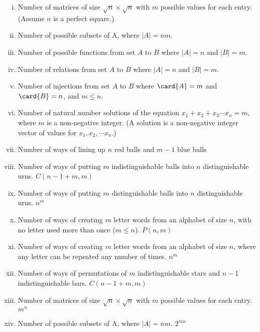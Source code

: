 \documentclass[quiz]{mcs}
\begin{document}
\begin{problem}
\begin{enumerate}[(i)]
\item Number of matrices of size $\sqrt{n} \times \sqrt{n}$ with $m$
possible values for each entry.  (Assume $n$ is a perfect square.)

\item Number of possible subsets of A, where $|A|=nm$.

\item Number of possible functions from set $A$ to $B$ where $|A|=n$ and $|B|=m$.

\item Number of relations from set $A$ to $B$ where $|A|=n$ and $|B|=m$.

\item Number of injections from set $A$ to $B$ where $\card{A}=m$ and
$\card{B}=n$, and $m \leq n$.

\item Number of natural number solutions of the equation $x_1 + x_2 + x_3
\cdots x_n = m$, where $m$ is a non-negative integer.  (A solution is
a non-negative integer vector of values for $x_1,x_2,\cdots x_n$.)

\item Number of ways of lining up $n$ red balls and $m-1$ blue balls


\item
Number of ways of putting $m$ indistinguishable balls into $n$
distinguishable urns. $C(n-1+m,m)$

\item Number of ways of putting $m$ distinguishable balls into $n$
distinguishable urns. $n^m$

\item Number of ways of creating $m$ letter words from an alphabet of size $n$,
with no letter used more than once ($m \leq n$). $P(n,m)$

\item Number of ways of creating $m$ letter words from an alphabet of size $n$,
where any letter can be repeated any number of times. $n^m$

\item Number of ways of permutations of $m$ indistinguishable stars and
$n-1$ indistinguishable bars. $C(n-1+m,m)$

\item Number of matrices of size $\sqrt{n} \times \sqrt{n}$ with
$m$ possible values for each entry. $m^n$

\item Number of possible subsets of A, where $|A|=nm$. $2^{mn}$


\end{enumerate}
\end{problem}
\end{document}
